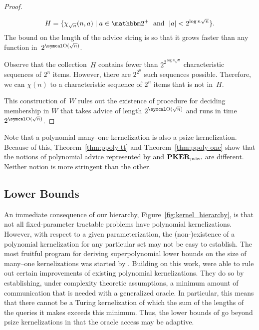 \begin{proof}
\begin{codelisting}
\begin{codelisting}
\begin{equation*}
        H = \{\chi_{\sqrt{n}}(n, a) \st a \in \binary^+ \reland \length{a} < 2^{\log n \sqrt{n}}\}.
      \end{equation*}
      The bound on the length of the advice string is so that it grows faster than any function in~$2^{\bigO(\sqrt{n})}$.
    \item
      Observe that the collection~$H$ contains fewer than $2^{2^{\log n \sqrt{n}}}$ characteristic sequences of $2^n$ items.
      However, there are $2^{2^n}$ such sequences possible.
      Therefore, we can  $\chi(n)$ to a characteristic sequence of $2^n$ items that is not in~$H$.
    \end{codelisting}
  \end{codelisting}
  This construction of~$W$ rules out the existence of procedure for deciding membership in $W$ that takes advice of length $2^{\bigO(\sqrt{n})}$ and runs in time $2^{\bigO(\sqrt{n})}$.
\end{proof}

Note that a polynomial many--one kernelization is also a psize kernelization.
Because of this, Theorem~\ref{thm:ppoly-tt} and Theorem~\ref{thm:ppoly-one} show that the notions of polynomial advice represented by  and $\textnormal{\textbf{PKER}}_\textnormal{psize}$ are different.
Neither notion is more stringent than the other.

\subsection{Lower Bounds}
An immediate consequence of our hierarchy, Figure~\ref{fig:kernel_hierarchy}, is that not all fixed-parameter tractable problems have polynomial kernelizations.
However, with respect to a given parameterization, the (non-)existence of a polynomial kernelization for any particular set may not be easy to establish.
The most fruitful program for deriving superpolynomial lower bounds on the size of many--one kernelizations was started by \textcite{bodlaender2009problems}.
Building on this work, \textcite{dell2014satisfiability} were able to rule out certain improvements of existing polynomial kernelizations.
They do so by establishing, under complexity theoretic assumptions, a minimum amount of communication that is needed with a generalized oracle.
In particular, this means that there cannot be a Turing kernelization of which the sum of the lengths of the queries it makes exceeds this minimum.
Thus, the lower bounds of \citeauthor{dell2014satisfiability} go beyond psize kernelizations in that the oracle access may be adaptive.

